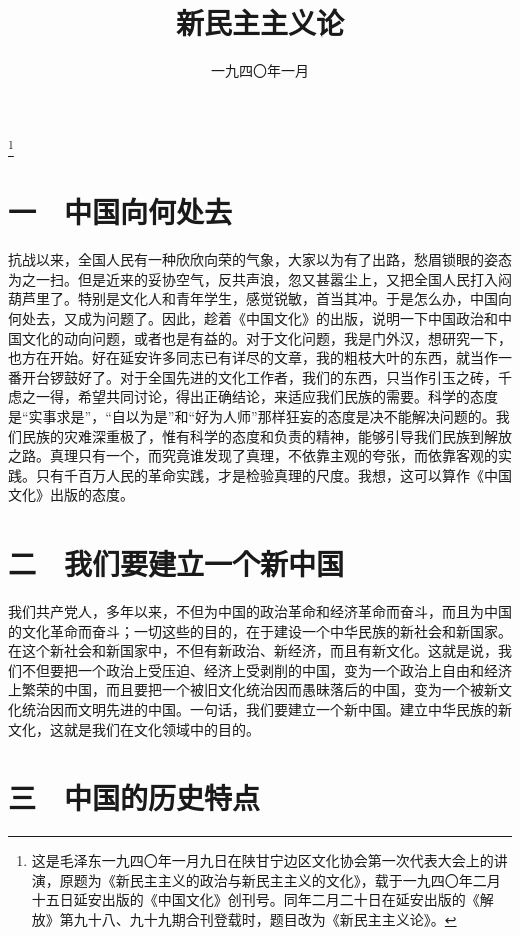 
\title{新民主主义论}
\date{一九四〇年一月}
\thanks{这是毛泽东一九四〇年一月九日在陕甘宁边区文化协会第一次代表大会上的讲演，原题为《新民主主义的政治与新民主主义的文化》，载于一九四〇年二月十五日延安出版的《中国文化》创刊号。同年二月二十日在延安出版的《解放》第九十八、九十九期合刊登载时，题目改为《新民主主义论》。}
\maketitle


\section{一　中国向何处去}

抗战以来，全国人民有一种欣欣向荣的气象，大家以为有了出路，愁眉锁眼的姿态为之一扫。但是近来的妥协空气，反共声浪，忽又甚嚣尘上，又把全国人民打入闷葫芦里了。特别是文化人和青年学生，感觉锐敏，首当其冲。于是怎么办，中国向何处去，又成为问题了。因此，趁着《中国文化》的出版，说明一下中国政治和中国文化的动向问题，或者也是有益的。对于文化问题，我是门外汉，想研究一下，也方在开始。好在延安许多同志已有详尽的文章，我的粗枝大叶的东西，就当作一番开台锣鼓好了。对于全国先进的文化工作者，我们的东西，只当作引玉之砖，千虑之一得，希望共同讨论，得出正确结论，来适应我们民族的需要。科学的态度是“实事求是”，“自以为是”和“好为人师”那样狂妄的态度是决不能解决问题的。我们民族的灾难深重极了，惟有科学的态度和负责的精神，能够引导我们民族到解放之路。真理只有一个，而究竟谁发现了真理，不依靠主观的夸张，而依靠客观的实践。只有千百万人民的革命实践，才是检验真理的尺度。我想，这可以算作《中国文化》出版的态度。

\section{二　我们要建立一个新中国}

我们共产党人，多年以来，不但为中国的政治革命和经济革命而奋斗，而且为中国的文化革命而奋斗；一切这些的目的，在于建设一个中华民族的新社会和新国家。在这个新社会和新国家中，不但有新政治、新经济，而且有新文化。这就是说，我们不但要把一个政治上受压迫、经济上受剥削的中国，变为一个政治上自由和经济上繁荣的中国，而且要把一个被旧文化统治因而愚昧落后的中国，变为一个被新文化统治因而文明先进的中国。一句话，我们要建立一个新中国。建立中华民族的新文化，这就是我们在文化领域中的目的。

\section{三　中国的历史特点}

